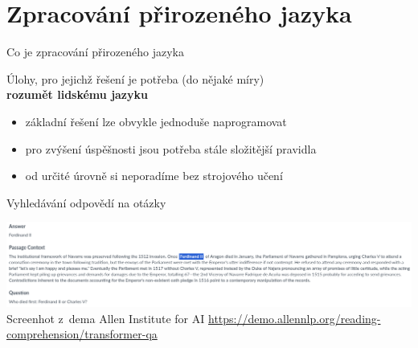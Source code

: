 \documentclass[aspectratio=169,dvipsnames]{beamer}
\begin{document}


\section[Zpracování jazyka]{Zpracování přirozeného jazyka}

\begin{frame}{Co je zpracování přirozeného jazyka}

    \begin{center}

        \Large Úlohy, pro jejichž řešení je potřeba (do nějaké míry) \\ \textbf{rozumět
        lidskému jazyku}

    \end{center}

    \begin{itemize}[<+->]

        \item<2-> základní řešení lze obvykle jednoduše naprogramovat

        \item<3-> pro zvýšení úspěšnosti jsou potřeba stále složitější pravidla

        \item<4-> od určité úrovně si neporadíme bez strojového učení

    \end{itemize}

\end{frame}


\begin{frame}{Vyhledávání odpovědí na otázky}

    \centering
    \includegraphics[scale=.26]{img/qa.png} \\
    {\tiny Screenhot z~dema Allen Institute for AI \url{https://demo.allennlp.org/reading-comprehension/transformer-qa}}

\end{frame}
\end{document}
